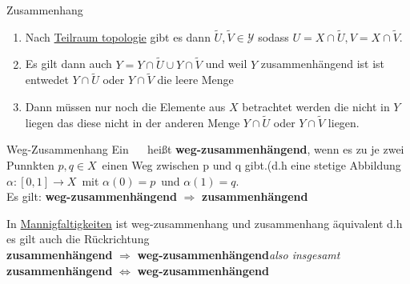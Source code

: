 \begin{titleDef}{Zusammenhang}
\begin{enumerate}
	\item Nach \hyperref[teilraumTopo]{Teilraum topologie} gibt es dann $\widetilde{U},\widetilde{V}\in\mathcal{Y}$ sodass $U=X\cap\widetilde{U},V=X\cap\widetilde{V}$.
	\item Es gilt dann auch $Y=Y\cap\widetilde{U}\cup Y\cap\widetilde{V}$ und weil $Y$ zusammenhängend ist ist entwedet $Y\cap\widetilde{U}$ oder $Y\cap\widetilde{V}$ die leere Menge
	\item Dann müssen nur noch die Elemente aus $X$ betrachtet werden die nicht in $Y$ liegen das diese nicht in der anderen Menge $Y\cap\widetilde{U}$ oder $Y\cap\widetilde{V}$ liegen.
\end{enumerate}
\end{titleDef}

\begin{titleDef}{Weg-Zusammenhang}
\label{wegzusammenhang}
Ein \Toporeflong~\Topo~ heißt \textbf{weg-zusammenhängend}, wenn es zu je zwei Punnkten $p,q\in X$~einen Weg zwischen p und q gibt.(d.h eine stetige Abbildung $\alpha:[0,1]\to X$~mit $\alpha(0)=p$~und $\alpha(1)=q$.\\
Es gilt: \textbf{weg-zusammenhängend }$\Longrightarrow$ \textbf{ zusammenhängend}\par
In \hyperref[Mannigfaltigkeit]{Mannigfaltigkeiten} ist weg-zusammenhang und zusammenhang äquivalent d.h es gilt auch die Rückrichtung\\
\textbf{zusammenhängend }$\Longrightarrow$ \textbf{weg-zusammenhängend}\hfill \textit{also insgesamt}\\
\textbf{zusammenhängend }$\Longleftrightarrow$ \textbf{weg-zusammenhängend}
\end{titleDef}

